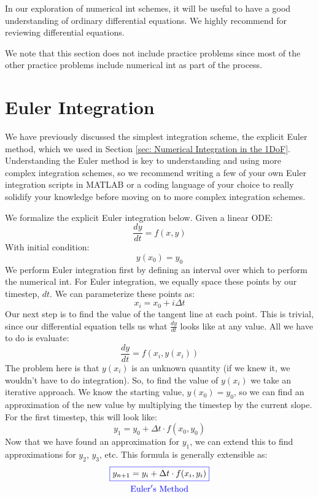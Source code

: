 \documentclass[12pt]{report}
\begin{document}
In our exploration of \gls{numerical int} schemes, it will be useful to have a good understanding of ordinary differential equations. We highly recommend \cite{dawkins_differential_2023} for reviewing differential equations.

We note that this section does not include practice problems since most of the other practice problems include \gls{numerical int} as part of the process.

\section{Euler Integration}\label{sec:euler integration}
We have previously discussed the simplest integration scheme, the explicit Euler method, which we used in Section \ref{sec: Numerical Integration in the 1DoF}. Understanding the Euler method is key to understanding and using more complex integration schemes, so we recommend writing a few of your own Euler integration scripts in MATLAB or a coding language of your choice to really solidify your knowledge before moving on to more complex integration schemes. 

We formalize the explicit Euler integration below. Given a linear ODE:
$$\frac{dy}{dt}=f\left(x,y\right)$$
With initial condition:
$$y(x_0)=y_0$$
We perform Euler integration first by defining an interval over which to perform the \gls{numerical int}. For Euler integration, we equally space these points by our timestep, $dt$. We can parameterize these points as:
$$x_i=x_0+i\Delta t$$
Our next step is to find the value of the tangent line at each point. This is trivial, since our differential equation tells us what $\frac{dy}{dt}$ looks like at any value. All we have to do is evaluate:
$$\frac{dy}{dt}=f\left(x_i,y(x_i)\right)$$
The problem here is that $y(x_i)$ is an unknown quantity (if we knew it, we wouldn’t have to do integration). So, to find the value of $y(x_i)$ we take an iterative approach. We know the starting value, $y(x_0)=y_0$, so we can find an approximation of the new value by multiplying the timestep by the current slope. For the first timestep, this will look like:
$$y_1=y_0+\Delta t\cdot f(x_0,y_0)$$
Now that we have found an approximation for $y_1$, we can extend this to find approximations for $y_2$, $y_3$, etc. This formula is generally extensible as:
\begin{gather}
    \color{blue}\boxed{\color{black}y_{n+1}=y_i+\Delta t \cdot f(x_i,y_i)}\\
    \color{blue}\mathrm{Euler's \ Method}
\end{gather}
\end{document}
